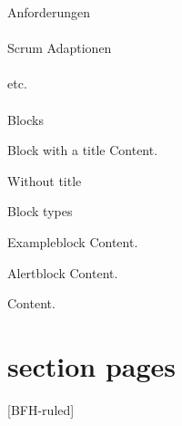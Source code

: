 \documentclass[
    ngerman,%
    authorontitle=true,
]{bfhbeamer}
\begin{document}
    \begin{frame}{Anforderungen}
        \framesubtitle{}
    \end{frame}

    \begin{frame}{Scrum Adaptionen}
        \framesubtitle{}
    \end{frame}

    \begin{frame}{etc.}
        \framesubtitle{}
    \end{frame}

    \begin{frame}{Blocks}
        \begin{block}{Block with a title}
            Content.
        \end{block}
        \begin{block}{}
            Without title
        \end{block}
    \end{frame}

    \begin{frame}{Block types}
        \begin{exampleblock}{Exampleblock}
            Content.
        \end{exampleblock}
        \begin{alertblock}{Alertblock}
            Content.
        \end{alertblock}
        \begin{example}
            Content.
        \end{example}
    \end{frame}


    \section{section pages}

    [BFH-ruled]
    \frame{\sectionpage}





\end{document}
